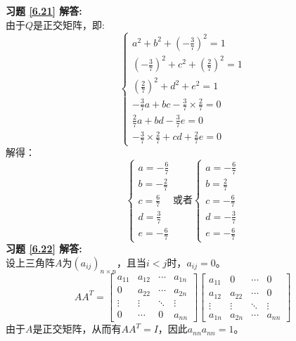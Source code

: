 \textbf{习题 \ref{6.21} 解答:}\\
由于$Q$是正交矩阵，即:
\begin{equation*}
\begin{cases}
  a^2+b^2+(-\frac{3}{7})^2 = 1 \\
  (-\frac{3}{7})^2+c^2+(\frac{2}{7})^2 = 1 \\
  (\frac{2}{7})^2+d^2+e^2 = 1 \\
  -\frac{3}{7}a+bc-\frac{3}{7}\times\frac{2}{7} = 0 \\
  \frac{2}{7}a+bd-\frac{3}{7}e = 0 \\
  -\frac{3}{7}\times\frac{2}{7}+cd+\frac{2}{7}e = 0
\end{cases}
\end{equation*}
解得：
\begin{equation*}
\begin{cases}
  a = -\frac{6}{7}\\
  b = -\frac{2}{7} \\
  c = \frac{6}{7} \\
  d = \frac{3}{7} \\
  e = -\frac{6}{7}
\end{cases}
\text{或者}
\begin{cases}
  a = -\frac{6}{7}\\
  b = \frac{2}{7} \\
  c = -\frac{6}{7} \\
  d = -\frac{3}{7} \\
  e = -\frac{6}{7}
\end{cases}
\end{equation*}
\textbf{习题 \ref{6.22} 解答:}\\
设上三角阵$A$为$(a_{ij})_{n\times n}$，且当$i<j$时，$a_{ij}=0$。
\begin{equation*}
  AA^T=\begin{bmatrix}
  a_{11}&a_{12}&\cdots&a_{1n}\\
  0&a_{22}&\cdots&a_{2n}\\
  \vdots&\vdots&\ddots&\vdots\\
  0&\cdots&0&a_{nn}
  \end{bmatrix}
  \begin{bmatrix}
  a_{11}&0&\cdots&0\\
  a_{12}&a_{22}&\cdots&0\\
  \vdots&\vdots&\ddots&\vdots\\
  a_{1n}&a_{2n}&\cdots&a_{nn}
  \end{bmatrix}
\end{equation*}
由于$A$是正交矩阵，从而有$AA^T=I$，因此$a_{nn}a_{nn}=1$。\\
